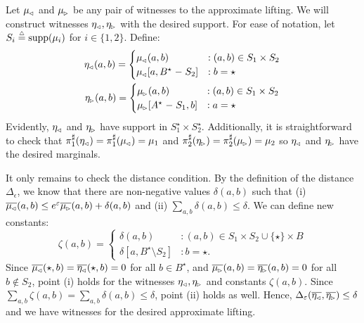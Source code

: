 \documentclass{lmcs}
\begin{document}
\proofatend
  Let $\mu\lside$ and $\mu\rside$ be any pair of witnesses to the approximate
  lifting. We will construct witnesses $\eta\lside, \eta\rside$ with the
  desired support. For ease of notation, let $S_i \eqdef \supp(\mu_i)$ for
  $i \in \{ 1, 2 \}$.  Define:
  \[
    \begin{gathered}
    \eta\lside(a, b) =
    \begin{cases}
      \mu\lside(a, b) &: (a, b) \in S_1 \times S_2 \\
      \mu\lside[a, B^\star \setminus S_2] &: b = \star
    \end{cases} \\
    \eta\rside(a, b) =
    \begin{cases}
      \mu\rside(a, b) &: (a, b) \in S_1 \times S_2 \\
      \mu\rside[A^\star \setminus S_1, b] &: a = \star
    \end{cases}
    \end{gathered}
  \]
  Evidently, $\eta\lside$ and $\eta\rside$ have support in $S_1^\star \times
  S_2^\star$. Additionally, it is straightforward to check that
  $\dfst(\eta\lside) = \dfst(\mu\lside) = \mu_1$ and $\dsnd(\eta\rside) =
  \dsnd(\mu\rside) = \mu_2$ so $\eta\lside$ and $\eta\rside$ have the desired
  marginals.

  It only remains to check the distance condition. By the definition of the
  distance $\Delta_\epsilon$, we know that there are non-negative values
  $\delta(a, b)$ such that (i) $\overline{\mu\lside}(a, b) \leq e^\epsilon
  \overline{\mu\rside}(a, b) + \delta(a, b)$ and (ii) $\sum_{a, b} \delta(a, b)
  \leq \delta$. We can define new constants:
  \[
    \zeta(a, b) =
    \begin{cases}
      \delta(a, b) &: (a, b) \in S_1 \times S_2 \cup \{ \star \} \times B \\
      \delta[a, B^\star \setminus S_2] &: b = \star .
    \end{cases}
  \]
  Since $\overline{\mu\lside}(\star, b) = \overline{\eta\lside}(\star, b) = 0$
  for all $b \in B^\star$, and $\overline{\mu\rside}(a, b) =
  \overline{\eta\rside}(a, b) = 0$ for all $b \notin S_2$, point (i) holds for
  the witnesses $\eta\lside, \eta\rside$ and constants $\zeta(a, b)$. Since
  $\sum_{a, b} \zeta(a, b) = \sum_{a, b} \delta(a,b) \leq \delta$, point (ii)
  holds as well. Hence, $\Delta_\epsilon(\overline{\eta\lside},
  \overline{\eta\rside}) \leq \delta$ and we have witnesses for the desired
  approximate lifting.
\endproofatend
\end{document}
